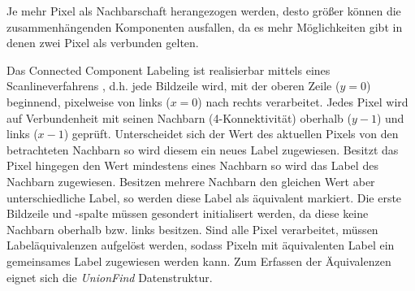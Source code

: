 %
Je mehr Pixel als Nachbarschaft herangezogen werden, desto größer können die zusammenhängenden Komponenten ausfallen, da es mehr Möglichkeiten gibt in denen zwei Pixel als verbunden gelten.

Das Connected Component Labeling ist realisierbar mittels eines Scanlineverfahrens \cite[S.~69--75]{compvis2001}, d.h. jede Bildzeile wird, mit der oberen Zeile ($y=0$) beginnend, pixelweise von links ($x=0$) nach rechts verarbeitet.
Jedes Pixel wird auf Verbundenheit mit seinen Nachbarn (4-Konnektivität) oberhalb ($y-1$) und links ($x-1$) geprüft.
Unterscheidet sich der Wert des aktuellen Pixels von den betrachteten Nachbarn so wird diesem ein neues Label zugewiesen.
Besitzt das Pixel hingegen den Wert mindestens eines Nachbarn so wird das Label des Nachbarn zugewiesen.
Besitzen mehrere Nachbarn den gleichen Wert aber unterschiedliche Label, so werden diese Label als äquivalent markiert.
Die erste Bildzeile und -spalte müssen gesondert initialisert werden, da diese keine Nachbarn oberhalb bzw. links besitzen.
Sind alle Pixel verarbeitet, müssen Labeläquivalenzen aufgelöst werden, sodass Pixeln mit äquivalenten Label ein gemeinsames Label zugewiesen werden kann. Zum Erfassen der Äquivalenzen eignet sich die \emph{UnionFind} Datenstruktur.
%
